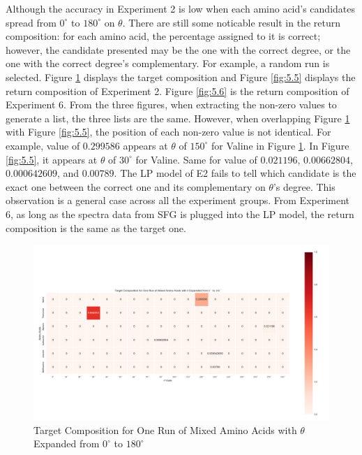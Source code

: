 Although the accuracy in Experiment 2 is low when each amino acid's candidates spread from $0^{\circ}$ to $180^{\circ}$ on $\theta$. There are still some noticable result in the return composition: for each amino acid, the percentage assigned to it is correct; however, the candidate presented may be the one with the correct degree, or the one with the correct degree's complementary. For example, a random run is selected. Figure \ref{fig:5.4} displays the target composition and Figure \ref{fig:5.5} displays the return composition of Experiment 2. Figure \ref{fig:5.6} is the return composition of Experiment 6. From the three figures, when extracting the non-zero values to generate a list, the three lists are the same. However, when overlapping Figure \ref{fig:5.4} with Figure  \ref{fig:5.5}, the position of each non-zero value is not identical. For example, value of $0.299586$ appears at $\theta$ of $150^{\circ}$ for Valine in Figure \ref{fig:5.4}. In Figure \ref{fig:5.5}, it appears at $\theta$ of $30^{\circ}$ for Valine. Same for value of $0.021196$, $0.00662804$, $0.000642609$, and $0.00789$. The LP model of E2 fails to tell which candidate is the exact one between the correct one and its complementary on $\theta$'s degree. This observation is a general case across all the experiment groups. From Experiment 6, as long as the spectra data from SFG is plugged into the LP model, the return composition is the same as the target one. \\


\begin{figure}[!ht] 
\centering
\includegraphics[scale=0.4]{Figures/mixture_target_composition_for_one_run_theta_0_180.png}
\caption{Target Composition for One Run of Mixed Amino Acids with $\theta$ Expanded from $0^{\circ}$ to $180^{\circ}$} 
\label{fig:5.4}
\end{figure}

